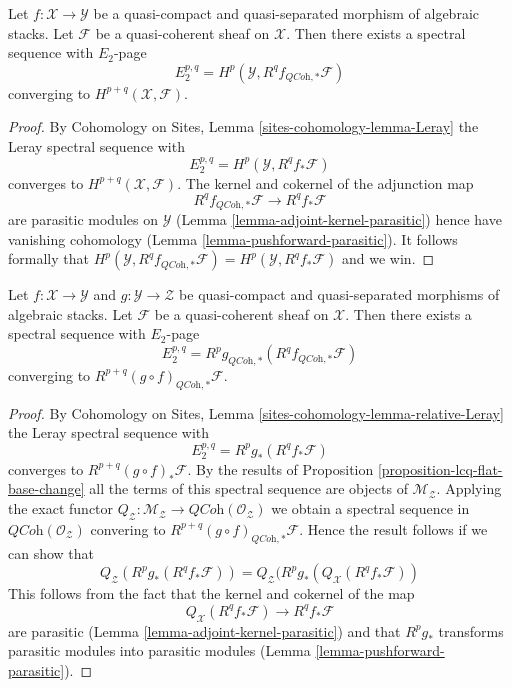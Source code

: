 \begin{lemma}
\label{lemma-leray}
Let $f : \mathcal{X} \to \mathcal{Y}$
be a quasi-compact and quasi-separated morphism of algebraic stacks.
Let $\mathcal{F}$ be a quasi-coherent sheaf on $\mathcal{X}$. Then
there exists a spectral sequence with $E_2$-page
$$
E_2^{p, q} = H^p(\mathcal{Y}, R^qf_{\textit{QCoh}, *}\mathcal{F})
$$
converging to $H^{p + q}(\mathcal{X}, \mathcal{F})$.
\end{lemma}

\begin{proof}
By Cohomology on Sites, Lemma \ref{sites-cohomology-lemma-Leray}
the Leray spectral sequence with
$$
E_2^{p, q} = H^p(\mathcal{Y}, R^qf_*\mathcal{F})
$$
converges to $H^{p + q}(\mathcal{X}, \mathcal{F})$. The kernel and cokernel
of the adjunction map
$$
R^qf_{\textit{QCoh}, *}\mathcal{F} \longrightarrow R^qf_*\mathcal{F}
$$
are parasitic modules on $\mathcal{Y}$
(Lemma \ref{lemma-adjoint-kernel-parasitic})
hence have vanishing cohomology
(Lemma \ref{lemma-pushforward-parasitic}).
It follows formally that
$H^p(\mathcal{Y}, R^qf_{\textit{QCoh}, *}\mathcal{F}) =
H^p(\mathcal{Y}, R^qf_*\mathcal{F})$ and we win.
\end{proof}

\begin{lemma}
\label{lemma-relative-leray}
Let $f : \mathcal{X} \to \mathcal{Y}$ and $g : \mathcal{Y} \to \mathcal{Z}$
be quasi-compact and quasi-separated morphisms of algebraic stacks.
Let $\mathcal{F}$ be a quasi-coherent sheaf on $\mathcal{X}$. Then
there exists a spectral sequence with $E_2$-page
$$
E_2^{p, q} = R^pg_{\textit{QCoh}, *}(R^qf_{\textit{QCoh}, *}\mathcal{F})
$$
converging to $R^{p + q}(g \circ f)_{\textit{QCoh}, *}\mathcal{F}$.
\end{lemma}

\begin{proof}
By Cohomology on Sites, Lemma \ref{sites-cohomology-lemma-relative-Leray}
the Leray spectral sequence with
$$
E_2^{p, q} = R^pg_*(R^qf_*\mathcal{F})
$$
converges to $R^{p + q}(g \circ f)_*\mathcal{F}$. By the results of
Proposition \ref{proposition-lcq-flat-base-change}
all the terms of this spectral sequence are objects of
$\mathcal{M}_\mathcal{Z}$. Applying the exact functor
$Q_\mathcal{Z} : \mathcal{M}_\mathcal{Z} \to
\textit{QCoh}(\mathcal{O}_\mathcal{Z})$ we obtain a spectral sequence in
$\textit{QCoh}(\mathcal{O}_\mathcal{Z})$ convering to
$R^{p + q}(g \circ f)_{\textit{QCoh}, *}\mathcal{F}$. Hence
the result follows if we can show that
$$
Q_\mathcal{Z}(R^pg_*(R^qf_*\mathcal{F})) =
Q_\mathcal{Z}(R^pg_*(Q_\mathcal{X}(R^qf_*\mathcal{F}))
$$
This follows from the fact that the kernel and cokernel of the map
$$
Q_\mathcal{X}(R^qf_*\mathcal{F}) \longrightarrow R^qf_*\mathcal{F}
$$
are parasitic (Lemma \ref{lemma-adjoint-kernel-parasitic}) and that
$R^pg_*$ transforms parasitic modules into parasitic modules
(Lemma \ref{lemma-pushforward-parasitic}).
\end{proof}

